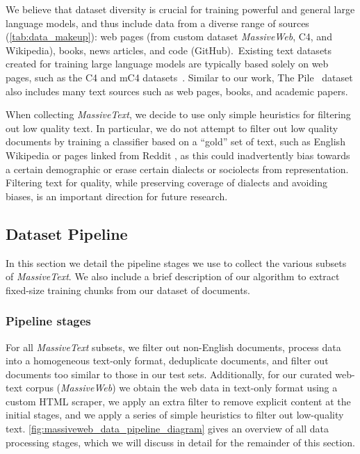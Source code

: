 \documentclass[11pt, a4paper, logo, internal, copyright, nonumbering]{deepmind}
\newcommand{\massivetext}{\textit{MassiveText}\xspace}
\newcommand{\massiveweb}{\textit{MassiveWeb}\xspace}
\begin{document}
We believe that dataset diversity is crucial for training powerful and general large language models, and thus include data from a diverse range of sources (\autoref{tab:data_makeup}): web pages (from custom dataset \massiveweb, C4, and Wikipedia), books, news articles, and code (GitHub).\ Existing text datasets created for training large language models are typically based solely on web pages, such as the C4 and mC4 datasets~\citep{raffel2020exploring, xue2020mt5}. Similar to our work, The Pile~\citep{pile} dataset also includes many text sources such as web pages, books, and academic papers.

When collecting \massivetext, we decide to use only simple heuristics for filtering out low quality text.
In particular, we do not attempt to filter out low quality documents by training a classifier based on a ``gold'' set of text, such as English Wikipedia or pages linked from Reddit \citep{radford2019language}, as this could inadvertently bias towards a certain demographic or erase certain dialects or sociolects from representation. Filtering text for quality, while preserving coverage of dialects and avoiding biases, is an important direction for future research.

\subsection{Dataset Pipeline}
\label{sec:dataset-pipeline}
In this section we detail the pipeline stages we use to collect the various subsets of \massivetext. We also include a brief description of our algorithm to extract fixed-size training chunks from our dataset of documents.

\subsubsection{Pipeline stages}
\label{app:dataset_pipeline_stages}

For all \massivetext subsets, we filter out non-English documents, process data into a homogeneous text-only format, deduplicate documents, and filter out documents too similar to those in our test sets. 
Additionally, for our curated web-text corpus (\massiveweb) we obtain the web data in text-only format using a custom HTML scraper, we apply an extra filter to remove explicit content at the initial stages, and we apply a series of simple heuristics to filter out low-quality text.
\autoref{fig:massiveweb_data_pipeline_diagram} gives an overview of all data processing stages, which we will discuss in detail for the remainder of this section.
\end{document}
